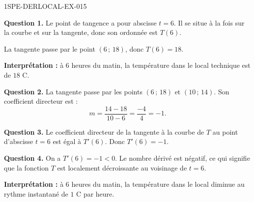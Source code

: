 \begin{corrige}{1SPE-DERLOCAL-EX-015}

\textbf{Question 1.} Le point de tangence a pour abscisse $t = 6$. Il se situe à la fois sur la courbe et sur la tangente, donc son ordonnée est $T(6)$.

La tangente passe par le point $(6\,;\,18)$, donc $\boxed{T(6) = 18}$.

\textbf{Interprétation :} à $6$ heures du matin, la température dans le local technique est de $18$ \degres C.

\textbf{Question 2.} La tangente passe par les points $(6\,;\,18)$ et $(10\,;\,14)$. Son coefficient directeur est :
\[
m = \dfrac{14 - 18}{10 - 6} = \dfrac{-4}{4} = -1.
\]

\textbf{Question 3.} Le coefficient directeur de la tangente à la courbe de $T$ au point d'abscisse $t = 6$ est égal à $T'(6)$. Donc $\boxed{T'(6) = -1}$.

\textbf{Question 4.} On a $T'(6) = -1 < 0$. Le nombre dérivé est négatif, ce qui signifie que la fonction $T$ est localement décroissante au voisinage de $t = 6$.

\textbf{Interprétation :} à $6$ heures du matin, la température dans le local diminue au rythme instantané de $1$ \degres C par heure.

\end{corrige}
